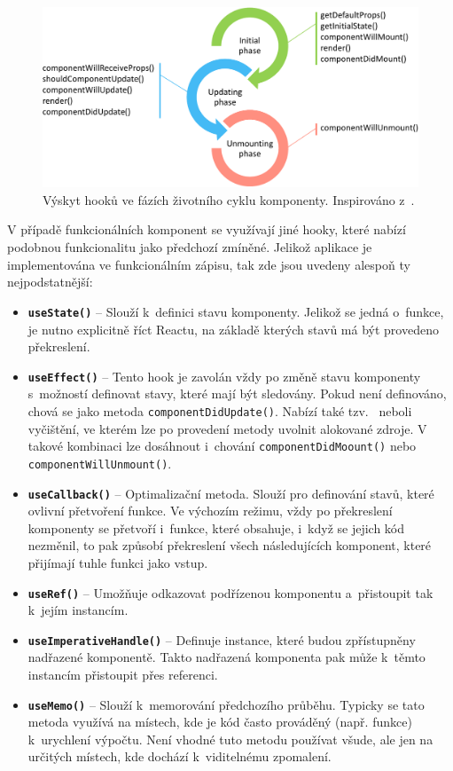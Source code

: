 \begin{figure}[hbt]
	\centering
	\setlength{\fboxsep}{0pt}
	\includegraphics[width=1\textwidth]{obrazky-figures/hooky_ve_fazich.pdf}
	\caption{Výskyt hooků ve fázích životního cyklu komponenty. Inspirováno z~\cite{article:BeginnersGuideToReact}.}
	\label{obr:Výskyt hooků ve fázích životního cyklu komponenty}
\end{figure}

V případě funkcionálních komponent se využívají jiné hooky, které nabízí podobnou funkcionalitu jako předchozí zmíněné. Jelikož aplikace je implementována ve funkcionálním zápisu, tak zde jsou uvedeny alespoň ty nejpodstatnější:
\begin{itemize}
    \item \textbf{\texttt{useState()}} -- Slouží k~definici stavu komponenty. Jelikož se jedná o~funkce, je nutno explicitně říct Reactu, na základě kterých stavů má být provedeno překreslení.
    \item \textbf{\texttt{useEffect()}} -- Tento hook je zavolán vždy po změně stavu komponenty s~možností definovat stavy, které mají být sledovány. Pokud není definováno, chová se jako metoda \texttt{componentDidUpdate()}. Nabízí také tzv.~ neboli vyčištění, ve kterém lze po provedení metody uvolnit alokované zdroje. V takové kombinaci lze dosáhnout i~chování \texttt{componentDidMoount()} nebo \texttt{componentWillUnmount()}.
    \item \textbf{\texttt{useCallback()}} -- Optimalizační metoda. Slouží pro definování stavů, které ovlivní přetvoření funkce. Ve výchozím režimu, vždy po překreslení komponenty se přetvoří i~funkce, které obsahuje, i~když se jejich kód nezměnil, to pak způsobí překreslení všech následujících komponent, které přijímají tuhle funkci jako vstup.
    \item \textbf{\texttt{useRef()}} -- Umožňuje odkazovat podřízenou komponentu a~přistoupit tak k~jejím instancím.
    \item \textbf{\texttt{useImperativeHandle()}} -- Definuje instance, které budou zpřístupněny nadřazené komponentě. Takto nadřazená komponenta pak může k~těmto instancím přistoupit přes referenci.
    \item \textbf{\texttt{useMemo()}} -- Slouží k~memorování předchozího průběhu. Typicky se tato metoda využívá na místech, kde je kód často prováděný (např. funkce) k~urychlení výpočtu. Není vhodné tuto metodu používat všude, ale jen na určitých místech, kde dochází k~viditelnému zpomalení.
\end{itemize}

